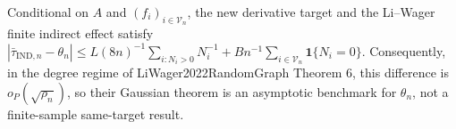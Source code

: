Conditional on \(A\) and \((f_i)_{i\in\mathcal V_n}\), the new derivative target and the Li--Wager finite indirect effect satisfy \( |\bar\tau_{\mathrm{IND},n}-\theta_n|\le L(8n)^{-1}\sum_{i:N_i>0}N_i^{-1}+Bn^{-1}\sum_{i\in\mathcal V_n}\mathbf 1\{N_i=0\}\). Consequently, in the degree regime of LiWager2022RandomGraph Theorem 6, this difference is \(o_P(\sqrt{\rho_n})\), so their Gaussian theorem is an asymptotic benchmark for \(\theta_n\), not a finite-sample same-target result.